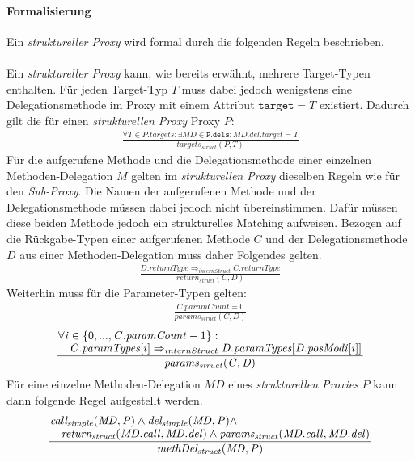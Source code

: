 \paragraph{Formalisierung}
Ein \emph{struktureller Proxy} wird formal durch die folgenden Regeln beschrieben.\\\\
Ein \emph{struktureller Proxy} kann, wie bereits erwähnt, mehrere Target-Typen enthalten.
Für jeden Target-Typ $T$ muss dabei jedoch wenigstens eine Delegationsmethode im Proxy mit einem Attribut $\texttt{target} = T$ existiert. Dadurch gilt die für einen \emph{strukturellen Proxy} Proxy $P$:
\begin{gather*}
\frac{\forall \mathit{T} \in \mathit{P.targets}:\exists \mathit{MD} \in \mathtt{P.dels}:\mathit{MD.del.target} = T}{\mathit{targets_{struct}(P, T)}}
\end{gather*}
Für die aufgerufene Methode und die Delegationsmethode einer einzelnen Methoden-Delegation $\mathit{M}$ gelten im \emph{strukturellen Proxy} dieselben Regeln wie für den \emph{Sub-Proxy}. Die Namen der aufgerufenen Methode und der Delegationsmethode müssen dabei jedoch nicht übereinstimmen. Dafür müssen diese beiden Methode jedoch ein strukturelles Matching aufweisen. Bezogen auf die Rückgabe-Typen einer aufgerufenen Methode $\mathit{C}$ und der Delegationsmethode $\mathit{D}$ aus einer Methoden-Delegation muss daher Folgendes gelten.
\begin{gather*}
\frac{\mathit{D.returnType} \Rightarrow_{internStruct} \mathit{C.returnType}}{\mathit{return_{struct}(C,D)}}
\end{gather*} 
Weiterhin muss für die Parameter-Typen gelten:
\begin{gather*}
\frac{\mathit{C.paramCount} = 0}{\mathit{params_{struct}(C,D)}}
\end{gather*} 
\begin{gather*}
\frac{\splitfrac{\forall \mathit{i} \in \{0,...,\mathit{C.paramCount}-1\}:}
{ \mathit{C.paramTypes}[i] \Rightarrow_{internStruct} \mathit{D.paramTypes}[\mathit{D.posModi}[i]]
}}{\mathit{params_{struct}(C,D)}}
\end{gather*} 
Für eine einzelne Methoden-Delegation $\mathit{MD}$ eines \emph{strukturellen Proxies} $P$ kann dann folgende Regel aufgestellt werden.
\begin{gather*}
\frac{\splitfrac{\mathit{call_{simple}(MD,P)} \wedge \mathit{del_{simple}(MD,P)} \wedge} {\mathit{return_{struct}(MD.call, MD.del)} \wedge \mathit{params_{struct}(MD.call, MD.del)}}
}
{\mathit{methDel_{struct}(MD,P)}}
\end{gather*}

